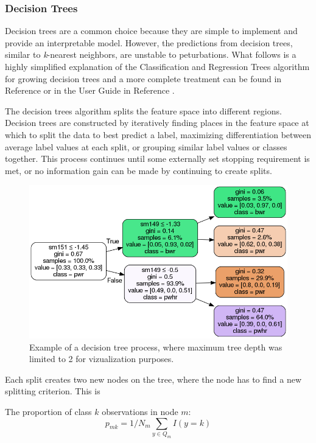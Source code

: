 \subsubsection{Decision Trees}

Decision trees are a common choice because they are simple to implement and
provide an interpretable model. However, the predictions from decision trees,
similar to \textit{k}-nearest neighbors, are unstable to peturbations.  What
follows is a highly simplified explanation of the Classification and Regression
Trees algorithm for growing decision trees and a more complete treatment can be
found in Reference \cite{elements_stats} or in the User Guide in Reference
\cite{scikit}.

The decision trees algorithm splits the feature space into different regions.
Decision trees are constructed by iteratively finding places in the feature
space at which to split the data to best predict a label, maximizing
differentiation between average label values at each split, or grouping similar
label values or classes together.  This process continues until some externally
set stopping requirement is met, or no information gain can be made by
continuing to create splits. 

\begin{figure}[!htb]
  \centering
  \includegraphics[width=\linewidth]{./chapters/litrev/dtree.png}
  \caption{Example of a decision tree process, where maximum tree depth was 
           limited to 2 for vizualization purposes.}
  \label{fig:dtr}
\end{figure}

Each split creates two new nodes on the tree, where the node has to find a new splitting criterion.
This is 

The proportion of class $k$ observations in node $m$: 
\[p_{mk} = 1/ N_m \sum_{y \in Q_m} I(y = k)\]

